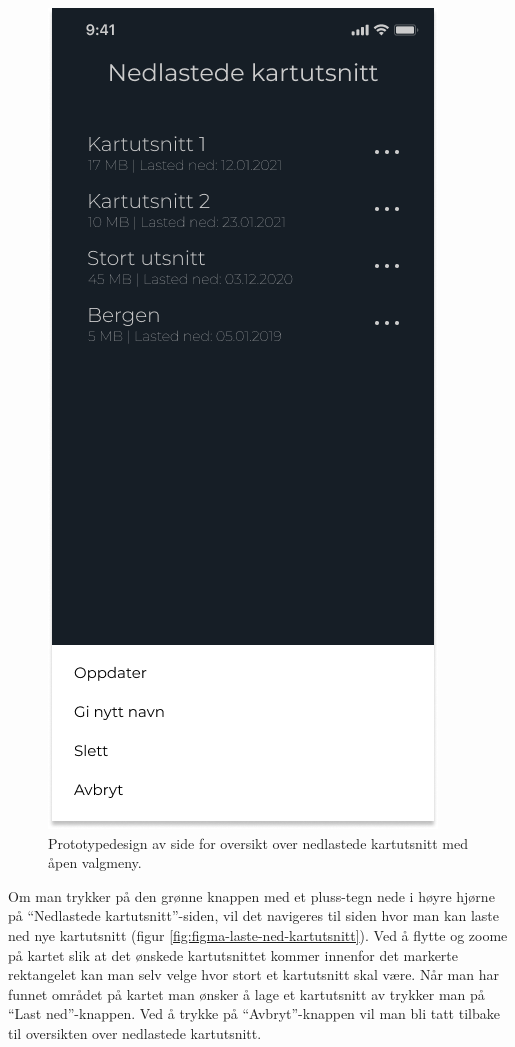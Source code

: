 \begin{figure}[H]
\centering
\captionsetup{width=.8\linewidth}
\includegraphics[scale=0.4]{Figurer/Figma/Frame 5 - Nedlastede kartutsnitt meny.png}
\caption{Prototypedesign av side for oversikt over nedlastede kartutsnitt med åpen valgmeny.}
\label{fig:figma-nedlastede-kartutsnitt-med-apen-meny}
\end{figure}
\noindent
Om man trykker på den grønne knappen med et pluss-tegn nede i høyre hjørne på \enquote{Nedlastede kartutsnitt}-siden, vil det navigeres til siden hvor man kan laste ned nye kartutsnitt (figur \ref{fig:figma-laste-ned-kartutsnitt}). Ved å flytte og zoome på kartet slik at det ønskede kartutsnittet kommer innenfor det markerte rektangelet kan man selv velge hvor stort et kartutsnitt skal være. Når man har funnet området på kartet man ønsker å lage et kartutsnitt av trykker man på \enquote{Last ned}-knappen. Ved å trykke på \enquote{Avbryt}-knappen vil man bli tatt tilbake til oversikten over nedlastede kartutsnitt.
